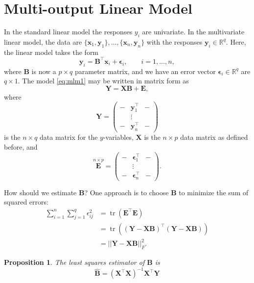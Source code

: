\documentclass[
]{book}
\newtheorem{proposition}{Proposition}[chapter]
\theoremstyle{definition}
\theoremstyle{definition}
\theoremstyle{definition}
\theoremstyle{definition}
\theoremstyle{remark}
\begin{document}
\hypertarget{multi-output-linear-model}{%
\section{Multi-output Linear Model}\label{multi-output-linear-model}}

In the standard linear model the responses \(y_i\) are univariate. In the multivariate linear model, the data are \(\{\mathbf x_1, \mathbf y_1\}, \ldots, \{\mathbf x_n, \mathbf y_n\}\) with the responses \(\mathbf y_i \in \mathbb{R}^q\). Here, the linear model takes the form
\begin{equation}
\mathbf y_i= \mathbf B^\top \mathbf x_i +{\pmb \epsilon}_i, \qquad i=1, \ldots , n,
\label{eq:mlm1}
\end{equation}
where \(\mathbf B\) is now a \(p \times q\) parameter matrix, and we have an error vector \({\pmb \epsilon}_i\in \mathbb{R}^q\) are \(q \times 1\). The model \eqref{eq:mlm1} may be written in matrix form as
\begin{equation}
\mathbf Y= \mathbf X\mathbf B+\mathbf E,
\label{eq:mlm2}
\end{equation}
where \[\mathbf Y=
\begin{pmatrix} - & \mathbf y_1^\top &-\\
&\vdots&\\
-&\mathbf y_n^\top&-\end{pmatrix}\] is the \(n \times q\) data matrix for the \(y\)-variables, \(\mathbf X\) is the \(n \times p\) data matrix as defined before, and \[\stackrel{n \times p}{\mathbf E}=\begin{pmatrix} - & \boldsymbol \epsilon_1^\top &-\\
&\vdots&\\
-&\boldsymbol \epsilon_n^\top&-\end{pmatrix}.\]

How should we estimate \(\mathbf B\)? One approach is to choose \(\mathbf B\) to minimize the sum of squared errors:
\begin{align}\sum_{i=1}^n\sum_{j=1}^q \epsilon_{ij}^2 &= \operatorname{tr}(\mathbf E^\top \mathbf E) \\
&= \operatorname{tr}((\mathbf Y-\mathbf X\mathbf B)^\top(\mathbf Y-\mathbf X\mathbf B))\\
&=||\mathbf Y-\mathbf X\mathbf B||_F^2.
\end{align}

\begin{proposition}
\protect\hypertarget{prp:eight1}{}{\label{prp:eight1} }The least squares estimator of \(\mathbf B\) is
\begin{equation}
\hat{\mathbf B}= (\mathbf X^\top \mathbf X)^{-1}\mathbf X^\top \mathbf Y
\label{eq:MVbeta}
\end{equation}
\end{proposition}
\end{document}
